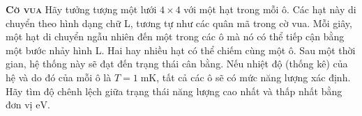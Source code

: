 \begin{problem}{\textbf{\textsc{Cờ vua}}}
	Hãy tưởng tượng một lưới $4 \times 4$ với một hạt trong mỗi ô. Các hạt này di chuyển theo hình dạng chữ L, tương tự như các quân mã trong cờ vua. Mỗi giây, một hạt di chuyển ngẫu nhiên đến một trong các ô mà nó có thể tiếp cận bằng một bước nhảy hình L. Hai hay nhiều hạt có thể chiếm cùng một ô. Sau một thời gian, hệ thống này sẽ đạt đến trạng thái cân bằng. Nếu nhiệt độ (thống kê) của hệ và do đó của mỗi ô là $T=1\; \mathrm{mK}$, tất cả các ô sẽ có mức năng lượng xác định. Hãy tìm độ chênh lệch giữa trạng thái năng lượng cao nhất và thấp nhất bằng đơn vị $\mathrm{eV}$.
	
	
	
	
	
	
	
\end{problem}
